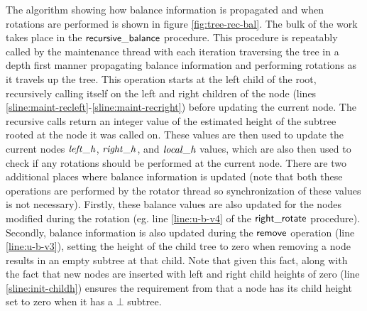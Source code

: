 The algorithm showing how balance information is propagated and when rotations are performed
is shown in figure \ref{fig:tree-rec-bal}.
The bulk of the work takes place in the $\act{recursive\_balance}$ procedure.
This procedure is repeatably called by the maintenance thread with each iteration traversing
the tree in a depth first manner propagating balance information and performing rotations
as it travels up the tree.
This operation starts at the left child of the root, recursively calling itself on the left
and right children of the node (lines \ref{sline:maint-recleft}-\ref{sline:maint-recright}) before updating the current node.
The recursive calls return an integer value of the estimated height of the subtree rooted
at the node it was called on.
These values are then used to update the current nodes $\ms{left\_h}$, $\ms{right\_h}$, and $\ms{local\_h}$
values, which are also then used to check if any rotations should be performed at the current node.
There are two additional places where balance information is updated
(note that both these operations are performed by the rotator thread so synchronization
of these values is not necessary).
Firstly, these balance values are also updated for the nodes modified during the rotation
(eg. line \ref{line:u-b-v4} of the $\act{right\_rotate}$ procedure).
Secondly, balance information is also updated during the $\act{remove}$ operation
(line \ref{line:u-b-v3}), setting the height of the child tree to zero when removing
a node results in an empty subtree at that child.
Note that given this fact, along with the fact that new nodes are inserted with left and right child heights of zero (line \ref{sline:init-childh})
ensures the requirement from \cite{IRISAppr} that a node has its child height set to zero when it has a $\bot$ subtree.

